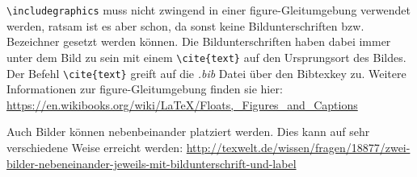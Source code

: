 \verb|\includegraphics| muss nicht zwingend in einer figure-Gleitumgebung verwendet werden, ratsam ist es aber schon, da sonst keine Bildunterschriften bzw. Bezeichner gesetzt werden können. Die Bildunterschriften haben dabei immer unter dem Bild zu sein mit einem \verb|\cite{text}| auf den Ursprungsort des Bildes. Der Befehl \verb|\cite{text}| greift auf die \emph{.bib} Datei über den Bibtexkey zu. Weitere Informationen zur figure-Gleitumgebung finden sie hier: \url{https://en.wikibooks.org/wiki/LaTeX/Floats,_Figures_and_Captions}\newline

Auch Bilder können nebenbeinander platziert werden. Dies kann auf sehr verschiedene Weise erreicht werden: \url{http://texwelt.de/wissen/fragen/18877/zwei-bilder-nebeneinander-jeweils-mit-bildunterschrift-und-label} 

